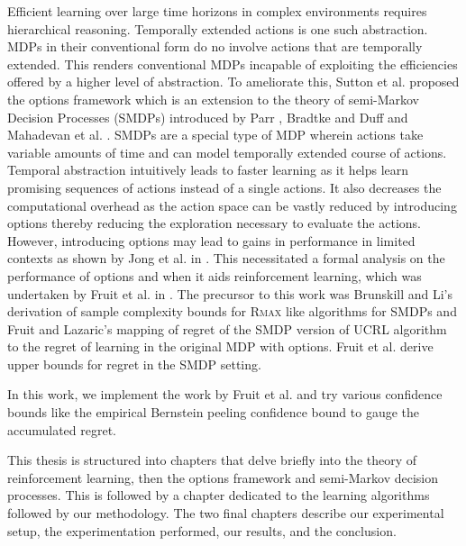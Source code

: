 Efficient learning over large time horizons in complex environments requires hierarchical reasoning.
Temporally extended actions is one such abstraction.
MDPs in their conventional form do no involve actions that are temporally extended.
This renders conventional MDPs incapable of exploiting the efficiencies offered by a higher level of abstraction.
To ameliorate this, Sutton et al. proposed the options framework \cite{sutton_between_1999} which is an extension to the theory of semi-Markov Decision Processes (SMDPs) introduced by Parr \cite{parr_reinforcement_nodate}, Bradtke and Duff \cite{bradtke_reinforcement_1995} and Mahadevan et al. \cite{mahadevan_self-improving_1997}.
SMDPs are a special type of MDP wherein actions take variable amounts of time and can model temporally extended course of actions.
Temporal abstraction intuitively leads to faster learning as it helps learn promising sequences of actions instead of a single actions.
It also decreases the computational overhead as the action space can be vastly reduced by introducing options thereby reducing the exploration necessary to evaluate the actions.
However, introducing options may lead to gains in performance in limited contexts as shown by Jong et al. in \cite{jong_utility_2008}.
This necessitated a formal analysis on the performance of options and when it aids reinforcement learning, which was undertaken by Fruit et al. in \cite{fruit_exploration--exploitation_2017}. 
The precursor to this work was Brunskill and Li's \cite{brunskill_pac-inspired_2014} derivation of sample complexity bounds for R\textsc{max} like algorithms for SMDPs and Fruit and Lazaric's \cite{fruit_exploration--exploitation_2017} mapping of regret of the SMDP version of UCRL algorithm to the regret of learning in the original MDP with options.
Fruit et al. \cite{fruit_exploration--exploitation_2017} derive upper bounds for regret in the SMDP setting.

In this work, we implement the work by Fruit et al.\cite{fruit_exploration--exploitation_2017} and try various confidence bounds like the empirical Bernstein peeling confidence bound to gauge the accumulated regret.

This thesis is structured into chapters that delve briefly into the theory of reinforcement learning, then the options framework and semi-Markov decision processes.
This is followed by a chapter dedicated to the learning algorithms followed by our methodology.
The two final chapters describe our experimental setup, the experimentation performed, our results, and the conclusion.


\newpage
